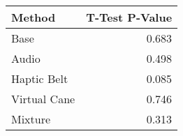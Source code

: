 
\centering
\begin{tabular}{lr}
\toprule
      Method &  T-Test P-Value \\
\midrule
        Base &           0.683 \\
       Audio &           0.498 \\
 Haptic Belt &           0.085 \\
Virtual Cane &           0.746 \\
     Mixture &           0.313 \\
\bottomrule
\end{tabular}
